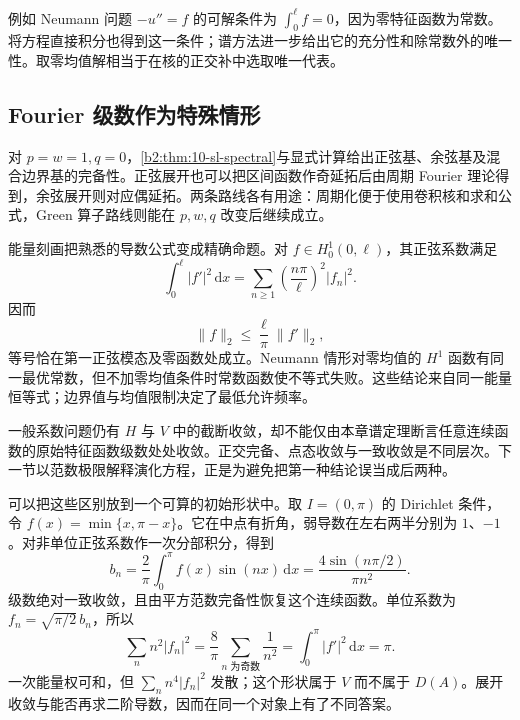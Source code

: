 \ProseParagraphBreak

例如 Neumann 问题 \(-u''=f\) 的可解条件为 \(\int_0^\ell f=0\)，因为零特征函数为常数。将方程直接积分也得到这一条件；谱方法进一步给出它的充分性和除常数外的唯一性。取零均值解相当于在核的正交补中选取唯一代表。

\subsection{Fourier 级数作为特殊情形}
\label{b2:subsec:100303}

对 \(p=w=1,q=0\)，\cref{b2:thm:10-sl-spectral}与显式计算给出正弦基、余弦基及混合边界基的完备性。正弦展开也可以把区间函数作奇延拓后由周期 Fourier 理论得到，余弦展开则对应偶延拓。两条路线各有用途：周期化便于使用卷积核和求和公式，Green 算子路线则能在 \(p,w,q\) 改变后继续成立。

\ProseParagraphBreak

能量刻画把熟悉的导数公式变成精确命题。对 \(f\in H_0^1(0,\ell)\)，其正弦系数满足
\[
 \int_0^\ell|f'|^2\,\mathrm{d}x
 =\sum_{n\geq1}\left(\dfrac{n\pi}{\ell}\right)^2|f_n|^2.
\]
因而
\[
 \|f\|_2\leq\dfrac\ell\pi\|f'\|_2,
\]
等号恰在第一正弦模态及零函数处成立。Neumann 情形对零均值的 \(H^1\) 函数有同一最优常数，但不加零均值条件时常数函数使不等式失败。这些结论来自同一能量恒等式；边界值与均值限制决定了最低允许频率。

\ProseParagraphBreak

一般系数问题仍有 \(H\) 与 \(V\) 中的截断收敛，却不能仅由本章谱定理断言任意连续函数的原始特征函数级数处处收敛。正交完备、点态收敛与一致收敛是不同层次。下一节以范数极限解释演化方程，正是为避免把第一种结论误当成后两种。

\ProseParagraphBreak

可以把这些区别放到一个可算的初始形状中。取 \(I=(0,\pi)\) 的 Dirichlet 条件，令 \(f(x)=\min\{x,\pi-x\}\)。它在中点有折角，弱导数在左右两半分别为 \(1\)、\(-1\)。对非单位正弦系数作一次分部积分，得到
\[
 b_n=\dfrac2\pi\int_0^\pi f(x)\sin(nx)\,\mathrm{d}x
 =\dfrac{4\sin(n\pi/2)}{\pi n^2}.
\]
级数绝对一致收敛，且由平方范数完备性恢复这个连续函数。单位系数为 \(f_n=\sqrt{\pi/2}\,b_n\)，所以
\[
 \sum_n n^2|f_n|^2=\dfrac8\pi\sum_{n\text{ 为奇数}}\dfrac1{n^2}
 =\int_0^\pi|f'|^2\,\mathrm{d}x=\pi.
\]
一次能量权可和，但 \(\sum_n n^4|f_n|^2\) 发散；这个形状属于 \(V\) 而不属于 \(D(A)\)。展开收敛与能否再求二阶导数，因而在同一个对象上有了不同答案。

